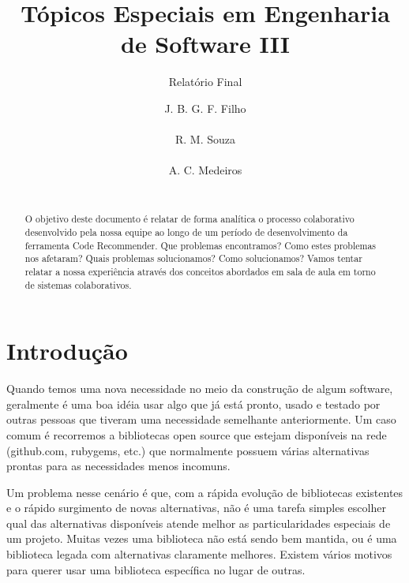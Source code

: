 \documentclass{acm_proc_article-sp}
\begin{document}
\title{Tópicos Especiais em Engenharia de Software III}
\subtitle{Relatório Final}


  
\author{
\alignauthor
J. B. G. F. Filho\\
       \\
\alignauthor 
R. M. Souza\\
       \\
\alignauthor
A. C. Medeiros\\
       \\
}

\maketitle
\begin{abstract}
O objetivo deste documento é relatar de forma analítica o processo colaborativo
desenvolvido pela nossa equipe ao longo de um período de desenvolvimento 
da ferramenta Code Recommender. Que problemas encontramos? Como estes problemas nos 
afetaram? Quais problemas solucionamos? Como solucionamos? Vamos tentar relatar a 
nossa experiência através dos conceitos abordados em sala de aula em torno de 
sistemas colaborativos.
\end{abstract}

\section{Introdução}
Quando temos uma nova necessidade no meio da construção de algum software,
geralmente é uma boa idéia usar algo que já está pronto,
usado e testado por outras pessoas que tiveram uma necessidade semelhante anteriormente.
Um caso comum é recorremos a bibliotecas open source que estejam disponíveis na rede (github.com, rubygems, etc.)
que normalmente possuem várias alternativas prontas para as necessidades menos incomuns.

Um problema nesse cenário é que, com a rápida evolução de bibliotecas existentes e o rápido surgimento de novas alternativas,
não é uma tarefa simples escolher qual das alternativas disponíveis atende melhor as particularidades especiais de um projeto.
Muitas vezes uma biblioteca não está sendo bem mantida, ou é uma biblioteca legada com alternativas claramente melhores. Existem
vários motivos para querer usar uma biblioteca específica no lugar de outras.
\end{document}
